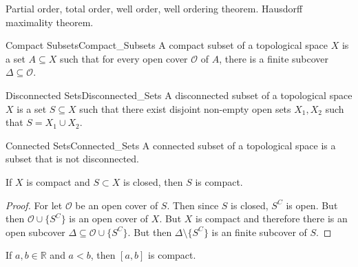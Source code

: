 \documentclass{book}                                                           %
\begin{document}
            Partial order, total order, well order, well ordering theorem. Hausdorff
            maximality theorem.
            \begin{ldefinition}{Compact Subsets}{Compact_Subsets}
                A compact subset of a topological space $X$ is a set $A\subseteq{X}$
                such that for every open cover $\mathcal{O}$ of $A$, there is a
                finite subcover $\Delta\subseteq\mathcal{O}$.
            \end{ldefinition}
            \begin{ldefinition}{Disconnected Sets}{Disconnected_Sets}
                A disconnected subset of a topological space $X$ is a set
                $S\subseteq{X}$ such that there exist disjoint non-empty open
                sets $X_{1},X_{2}$ such that $S=X_{1}\cup{X_{2}}$.
            \end{ldefinition}
            \begin{ldefinition}{Connected Sets}{Connected_Sets}
                A connected subset of a topological space
                is a subset that is not disconnected.
            \end{ldefinition}
            \begin{theorem}
                If $X$ is compact and $S\subset{X}$ is closed, then $S$ is compact.
            \end{theorem}
            \begin{proof}
                For let $\mathcal{O}$ be an open cover of $S$. Then since $S$ is
                closed, $S^{C}$ is open. But then $\mathcal{O}\cup\{S^{C}\}$ is
                an open cover of $X$. But $X$ is compact and therefore there is
                an open subcover $\Delta\subseteq\mathcal{O}\cup\{S^{C}\}$. But
                then $\Delta\setminus\{S^{C}\}$ is an finite subcover of $S$.
            \end{proof}
            \begin{theorem}
                If $a,b\in\mathbb{R}$ and $a<b$, then $[a,b]$ is compact.
            \end{theorem}
\end{document}
